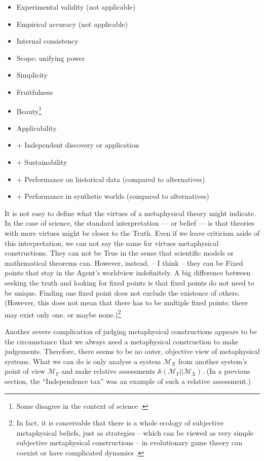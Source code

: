 \documentclass{article}
\begin{document}
\begin{itemize}
    \item Experimental validity (not applicable)
    \item Empirical accuracy (not applicable)
    \item Internal consistency
    \item Scope: unifying power
    \item Simplicity
    \item Fruitfulness
    \item Beauty\footnote{Some disagree in the context of science \cite{book:HossenfelderLostInMath,arxiv:LostInMathReview}.}
    \item Applicability
    \item + Independent discovery or application
    \item + Sustainability
    \item + Performance on historical data (compared to alternatives)
    \item + Performance in synthetic worlds (compared to alternatives)
\end{itemize}

It is not easy to define what the virtues of a metaphysical theory might indicate. In the case of science, the standard interpretation — or belief — is that theories with more virtues might be closer to the Truth. Even if we leave criticism aside of this interpretation, we can not say the same for virtues metaphysical constructions. They can not be True in the sense that scientific models or mathematical theorems can. However, instead, -- I think -- they can be Fixed points that stay in the Agent's worldview indefinitely.
A big difference between seeking the truth and looking for fixed points is that fixed points do not need to be unique. Finding one fixed point does not exclude the existence of others. (However, this does not mean that there has to be multiple fixed points; there may exist only one, or maybe none.)\footnote{In fact, it is conceivable that there is a whole ecology of subjective metaphysical beliefs, just as strategies -- which can be viewed as very simple subjective metaphysical constructions -- in evolutionary game theory can coexist or have complicated dynamics \cite{paper:ChaosGame}.}

Another severe complication of judging metaphysical constructions appears to be the circumstance that we always need a metaphysical construction to make judgements. Therefore, there seems to be no outer, objective view of metaphysical systems. What we can do is only analyse a system $\mathscr{M}_X$ from another system's point of view $\mathscr{M}_Y$ and make relative assessments $\mathbb{A}(\mathscr{M}_Y || \mathscr{M}_X)$.
(In a previous section, the ``Independence tax'' was an example of such a relative assessment.)
\end{document}
